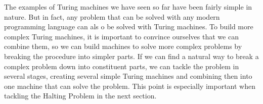 \documentclass[../../../include/open-logic-section]{subfiles}
\begin{document}

\begin{explain}
The examples of Turing machines we have seen so far have been fairly
simple in nature. But in fact, any problem that can be solved with any
modern programming language can als o be solved with Turing machines.
To build more complex Turing machines, it is important to convince
ourselves that we can combine them, so we can build machines to solve
more complex problems by breaking the procedure into simpler parts.
If we can find a natural way to break a complex problem down into
constituent parts, we can tackle the problem in several stages,
creating several simple Turing machines and combining then into one
machine that can solve the problem. This point is especially important
when tackling the Halting Problem in the next section.
\end{explain}
\end{document}

